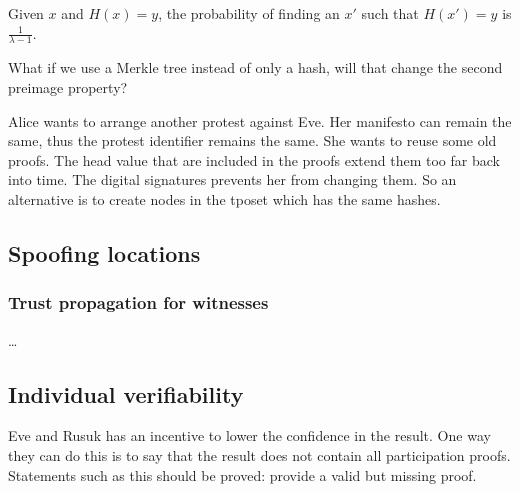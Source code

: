 \begin{proposition}
  Given \(x\) and \(H(x) = y\), the probability of finding an \(x'\) such that 
  \(H(x') = y\) is \(\frac{1}{\lambda-1}\).
\end{proposition}

\begin{question}
  What if we use a Merkle tree instead of only a hash, will that change the 
  second preimage property?
\end{question}

Alice wants to arrange another protest against Eve.
Her manifesto can remain the same, thus the protest identifier remains the 
same.
She wants to reuse some old proofs.
The head value that are included in the proofs extend them too far back into 
time.
The digital signatures prevents her from changing them.
So an alternative is to create nodes in the \ac{tposet} which has the same 
hashes.

\subsection{Spoofing locations}

\subsubsection{Trust propagation for witnesses}

\dots

\subsection{Individual verifiability}

Eve and Rusuk has an incentive to lower the confidence in the result.
One way they can do this is to say that the result does not contain all 
participation proofs.
Statements such as this should be proved: provide a valid but missing proof.
